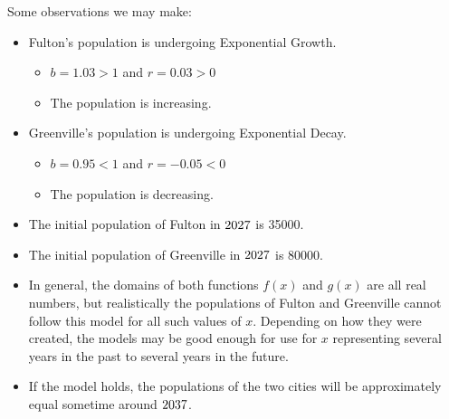 \begin{solution}
    Some observations we may make:
    \begin{itemize}
        \item Fulton’s population is undergoing Exponential Growth.
              \begin{itemize}
                  \item $b = 1.03 >1$ and $r = 0.03 > 0$
                  \item The population is increasing.
              \end{itemize}
        \item Greenville’s population is undergoing Exponential Decay.
              \begin{itemize}
                  \item $b = 0.95 < 1$ and $r = -0.05 < 0$
                  \item The population is decreasing.
              \end{itemize}
        \item The initial population of Fulton in $\the\numexpr\year+1\relax$ is 35000.
        \item The initial population of Greenville in $\the\numexpr\year+1\relax$ is 80000.
        \item In general, the domains of both functions $f(x)$ and $g(x)$ are all real numbers, but realistically the populations of Fulton and Greenville cannot follow this model for all such values of $x$. Depending on how they were created, the models may be good enough for use for $x$ representing several years in the past to several years in the future.
        \item If the model holds, the populations of the two cities will be approximately equal sometime around $\the\numexpr\year+11\relax$.
    \end{itemize}

\end{solution}